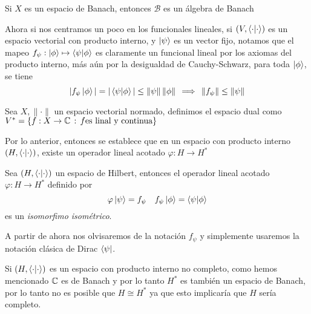 \documentclass[main.tex]{subfiles}
\begin{document}
\eje Si \(X\) es un espacio de Banach, entonces \(\mathcal{B}\) es un álgebra de Banach

Ahora si  nos centramos un poco en los funcionales lineales, si \((V,\braket{\cdot|\cdot})\) es un espacio vectorial con producto interno, y \(\ket{\psi}\) es un vector fijo, notamos que el mapeo \(f_{\psi}:\ket{\phi}\mapsto\braket{\psi|\phi}\) es claramente un funcional lineal por los axiomas del producto interno, más aún por la desigualdad de Cauchy-Schwarz, para toda \(\ket{\phi}\), se tiene
\[
|f_{\psi}\ket{\phi}|=|\braket{\psi|\phi}|\leq\|\psi\|\,\|\phi\|\,\implies\,\|f_{\psi}\|\leq\|\psi\|
\]
\begin{def.}
Sea \(X,\|\cdot\|\) un espacio vectorial normado, definimos el espacio dual como \(V^*=\{f:X\rightarrow\mathbb C \,:\,f \text{es linal y continua}\}\)
\end{def.}

Por lo anterior, entonces se establece que en un espacio con producto interno \((H,\braket{\cdot|\cdot})\), existe un operador lineal acotado \(\varphi:H\rightarrow H^*\)

\begin{teorema}\label{riez}
  Sea \((H,\braket{\cdot|\cdot})\) un espacio de Hilbert, entonces el operador lineal acotado \(\varphi:H\rightarrow H^*\) definido por
  \[
  \varphi\ket{\psi}=f_{\psi}\quad f_{\psi}\ket{\phi}=\braket{\psi|\phi}
  \]
  es un \emph{isomorfimo isométrico}.
  \end{teorema}
A partir de ahora nos olvisaremos de la notación \(f_{\psi}\) y simplemente usaremos la notación clásica de Dirac \(\bra{\psi}\).

\obs Si \((H,\braket{\cdot|\cdot})\) es un espacio con producto interno no completo, como hemos mencionado \(\mathbb C \) es de Banach y por lo tanto \(H^{*}\) es también un espacio de Banach, por lo tanto no es posible que \(H\cong H^{*}\) ya que esto implicaría que \(H\) sería completo.
\end{document}
